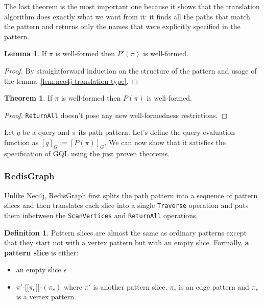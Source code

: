 \documentclass[14pt]{constructor-thesis}
\theoremstyle{definition}
\newtheorem{theorem}{Theorem}
\newtheorem{lemma}{Lemma}
\newtheorem{definition}{Definition}
\newcommand{\patternhop}[3]{#1 \texttt{-[[} #2 \texttt{]]-} (#3)}
\begin{document}
The last theorem is the most important one because it shows that the translation algorithm does exactly what we want from it: it finds all the paths that match the pattern and returns only the names that were explicitly specified in the pattern.

\begin{lemma}
  If $\pi$ is well-formed then $P'(\pi)$ is well-formed.
\end{lemma}
\begin{proof}
  By straightforward induction on the structure of the pattern and usage of the lemma~\ref{lem:neo4j-translation-type}.
\end{proof}

\begin{theorem}
  If $\pi$ is well-formed then $P(\pi)$ is well-formed.
\end{theorem}
\begin{proof}
  \texttt{ReturnAll} doesn't pose any new well-formedness restrictions.
\end{proof}

Let $q$ be a query and $\pi$ its path pattern. Let's define the query evaluation function as $[q]_G := [P(\pi)]_G$. We can now show that it satisfies the specification of GQL using the just proven theorems.

\subsubsection{RedisGraph}

Unlike Neo4j, RedisGraph first splits the path pattern into a sequence of pattern slices and then translates each slice into a single \texttt{Traverse} operation and puts them inbetween the \texttt{ScanVertices} and \texttt{ReturnAll} operations.

\begin{definition}
  Pattern slices are almost the same as ordinary patterns except that they start not with a vertex pattern but with an empty slice. Formally, \textbf{a pattern slice} is either:
  \begin{itemize}
    \item an empty slice $\epsilon$
    \item $\patternhop{\pi'}{\pi_e}{\pi_v}$ where $\pi'$ is another pattern slice, $\pi_e$ is an edge pattern and $\pi_v$ is a vertex pattern.
  \end{itemize}
\end{definition}
\end{document}
